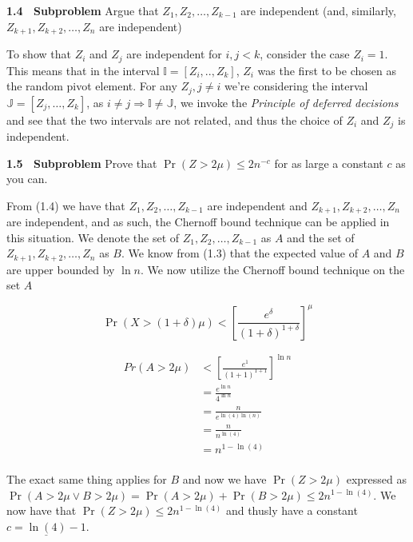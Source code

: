\documentclass[article,a4paper,oneside]{article}
\newcommand{\+}[1]{\ensuremath{\boldsymbol{#1}}}
\begin{document}
{\bf 1.4 \ Subproblem} Argue that $Z_1,Z_2,\ldots,Z_{k-1}$ are independent 
(and, similarly, $Z_{k+1},Z_{k+2},\ldots,Z_n$  are independent)

To show that $Z_i$ and $Z_j$ are independent for $i,j < k$, consider the case $Z_i = 1$. This means that in the interval $\mathbb{I} = [Z_i,..,Z_k]$, $Z_i$ was the first to be chosen as the random pivot element.
For any $Z_j, j \neq i$ we're considering the interval $\mathbb{J} = [Z_j,\ldots, Z_k]$, as $i \neq j \Rightarrow \mathbb{I} \neq \mathbb{J}$, we invoke the \emph{Principle of deferred decisions} and see that the two intervals are not related, and thus the choice of $Z_i$ and $Z_j$ is independent.

{\bf 1.5 \ Subproblem}
Prove that $\Pr(Z>2\mu)\leq 2 n^{-c}$ for as
large a constant $c$ as you can.

From (1.4) we have that $Z_1, Z_2, \ldots, Z_{k-1}$ are independent and $Z_{k+1}, Z_{k+2}, \ldots, Z_n$ are independent, and as such, the Chernoff bound technique can be applied in this situation. We denote the set of $Z_1, Z_2, \ldots, Z_{k-1}$ as $A$ and the set of $Z_{k+1}, Z_{k+2}, \ldots, Z_n$ as $B$. We know from (1.3) that the expected value of $A$ and $B$ are upper bounded by $\ln n$. We now utilize the Chernoff bound technique on the set $A$

$$\Pr \left( X > (1+\delta)\mu \right) < \left[ \frac{e^\delta}{(1+\delta)^{1+\delta}} \right]^\mu$$

\begin{align*}
  Pr( A > 2\mu) & <  \left[ \frac{e^1}{(1+1)^{1+1}} \right] ^{\ln n} \\
  &= \frac{e^{\ln n}}{4^{\ln n}}\\ 
  &= \frac {n}{e^{\ln(4)\ln(n)}} \\
  &= \frac{n}{n^{\ln(4)}}\\
  &= n^{1-\ln (4)}\\
\end{align*}

The exact same thing applies for $B$ and now we have $\Pr ( Z > 2\mu)$ expressed as $ \Pr ( A > 2\mu \vee B > 2\mu) = \Pr ( A > 2\mu) + \Pr( B > 2\mu) \leq 2n^{1-\ln(4)}$. We now have that $\Pr ( Z > 2\mu) \leq 2n^{1-\ln(4)}$ and thusly have a constant $\underline{c=\ln(4)-1}$.
\end{document}
